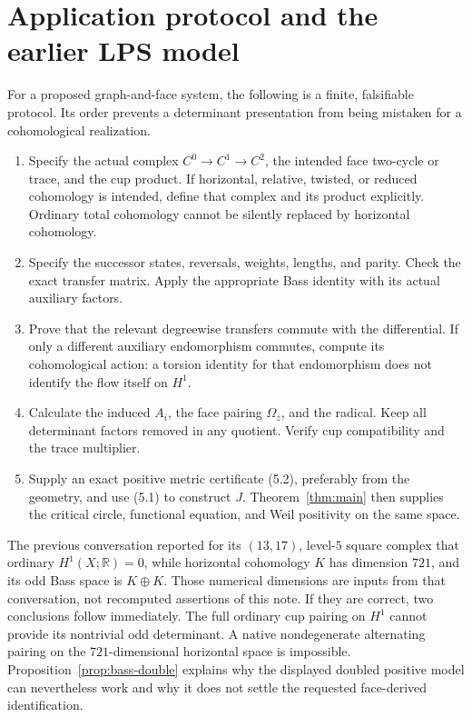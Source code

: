 \documentclass[11pt,a4paper]{article}
\theoremstyle{remark}\newtheorem{remark}[definition]{Remark}
\newcommand{\R}{\mathbb R}\newcommand{\C}{\mathbb C}\newcommand{\Z}{\mathbb Z}
\begin{document}
\section{Application protocol and the earlier LPS model}

For a proposed graph-and-face system, the following is a finite, falsifiable protocol. Its order prevents a determinant presentation from being mistaken for a cohomological realization.
\begin{enumerate}
\item Specify the actual complex $C^0\to C^1\to C^2$, the intended face two-cycle or trace, and the cup product. If horizontal, relative, twisted, or reduced cohomology is intended, define that complex and its product explicitly. Ordinary total cohomology cannot be silently replaced by horizontal cohomology.
\item Specify the successor states, reversals, weights, lengths, and parity. Check the exact transfer matrix. Apply the appropriate Bass identity with its actual auxiliary factors.
\item Prove that the relevant degreewise transfers commute with the differential. If only a different auxiliary endomorphism commutes, compute its cohomological action: a torsion identity for that endomorphism does not identify the flow itself on $H^1$.
\item Calculate the induced $A_i$, the face pairing $\Omega_z$, and the radical. Keep all determinant factors removed in any quotient. Verify cup compatibility and the trace multiplier.
\item Supply an exact positive metric certificate (5.2), preferably from the geometry, and use (5.1) to construct $J$. Theorem~\ref{thm:main} then supplies the critical circle, functional equation, and Weil positivity on the same space.
\end{enumerate}

The previous conversation reported for its $(13,17)$, level-$5$ square complex that ordinary $H^1(X;\R)=0$, while horizontal cohomology $K$ has dimension $721$, and its odd Bass space is $K\oplus K$. Those numerical dimensions are inputs from that conversation, not recomputed assertions of this note. If they are correct, two conclusions follow immediately. The full ordinary cup pairing on $H^1$ cannot provide its nontrivial odd determinant. A native nondegenerate alternating pairing on the $721$-dimensional horizontal space is impossible. Proposition~\ref{prop:bass-double} explains why the displayed doubled positive model can nevertheless work and why it does not settle the requested face-derived identification.
\end{document}
